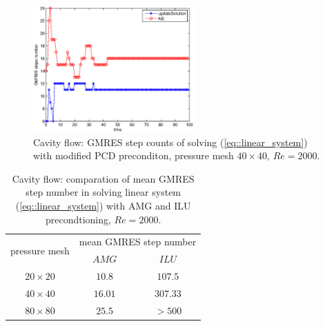 \documentclass{eajam}
\begin{document}
       \begin{figure}[!htbp]
         \begin{center}
             \includegraphics[width = 0.55\textwidth, angle = 0]{picture/cavity_flow_data/NS_iterate_steps.eps}
        \end{center}
        \caption{\small Cavity flow: GMRES step counts of solving
          (\ref{eq::linear_system}) with modified PCD preconditon,
          pressure mesh $40 \times 40$, $Re = 2000$.}
        \label{fig::cavity_GMRES_steps}
       \end{figure}
       
       \begin{table}[!htbp]
         \centering
         \begin{tabular}{ccc}
           \toprule
           \multirow{2}{*}{pressure mesh}  & \multicolumn{2}{c}{mean GMRES step number} \\
           \cline{2-3}
                           & $AMG$ & $ILU$ \\ \midrule
           $20 \times 20$   &      $10.8$           &     $107.5$
           \\ \midrule
           $40 \times 40$   &      $16.01$             &     $307.33$
           \\ \midrule       
           $80 \times 80$   &     $25.5$              &     $>500$
           \\ \bottomrule 
         \end{tabular}
         \caption{Cavity flow: comparation of mean GMRES step number in solving linear system
           (\ref{eq::linear_system}) with AMG and ILU precondtioning, $Re = 2000$.}
         \label{tab::comparation_GMRES_steps}
       \end{table}
\end{document}
